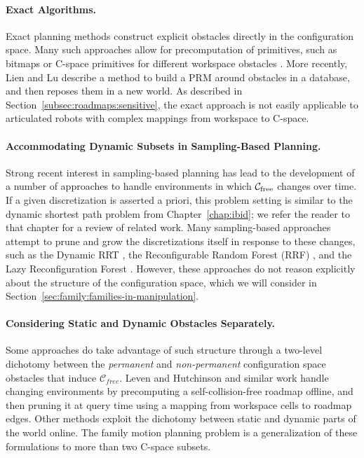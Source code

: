 \paragraph{Exact Algorithms.}
Exact planning methods construct explicit obstacles
directly in the configuration space.
Many such approaches allow for precomputation of primitives,
such as bitmaps \citep{kavraki1995cspacefft}
or C-space primitives for different workspace obstacles
\citep{newmanbranicky1991cspacetransforms}.
More recently,
Lien and Lu \citep{lien2009similarobstacles} describe a method to
build a PRM around obstacles in a database,
and then reposes them in a new world.
As described in Section~\ref{subsec:roadmaps:sensitive},
the exact approach is not easily applicable to articulated robots
with complex mappings from workspace to C-space.

\paragraph{Accommodating Dynamic Subsets in Sampling-Based Planning.}
Strong recent interest in sampling-based planning
has lead to the development of a number of approaches to handle
environments in which $\mathcal{C}_{\mbox{\scriptsize free}}$ changes over time.
If a given discretization is asserted a priori,
this problem setting is similar to the dynamic shortest path problem
from Chapter~\ref{chap:ibid};
we refer the reader to that chapter for a review of related work.
Many sampling-based approaches attempt to prune and grow
the discretizations itself in response to these changes,
such as the Dynamic RRT \citep{ferguson2006drrt},
the Reconfigurable Random Forest (RRF)
\citep{li2002incrementalprmmanagement},
and the Lazy Reconfiguration Forest
\citep{gayle2007lazyreconfigforest}.
However, these approaches do not reason explicitly about the
structure of the configuration space,
which we will consider
in Section~\ref{sec:family:families-in-manipulation}.

\paragraph{Considering Static and Dynamic Obstacles Separately.}
Some approaches do take advantage of such structure
through a two-level dichotomy between
the \emph{permanent} and \emph{non-permanent} configuration space
obstacles that induce $\mathcal{C}_{free}$.
Leven and Hutchinson \citep{leven2000changing, leven2002changing}
and similar work \citep{kallman2004dynamicroadmaps}
handle changing environments by
precomputing a self-collision-free roadmap offline,
and then pruning it at query time
using a mapping from workspace cells to roadmap edges.
Other methods \citep{jaillet2004dynamicprm}
exploit the dichotomy between static and dynamic parts of
the world online.
The family motion planning problem is a generalization of these
formulations to more than two C-space subsets.

